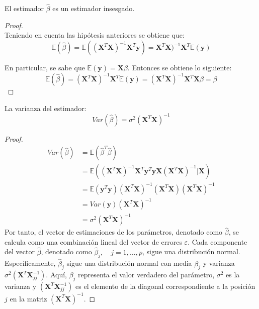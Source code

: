 \begin{propo}
El estimador $\hat{\beta}$ es un estimador insesgado.
\begin{proof}  
\noindent \\ Teniendo en cuenta las hipótesis anteriores se obtiene que:
\begin{equation}
\mathbb{E}(\hat{\beta})=\mathbb{E}((\textbf{X}^T\textbf{X})^{-1}\textbf{X}^T \mathbf{y})=\textbf{X}^T\textbf{X})^{-1}\textbf{X}^T\mathbb{E}(\mathbf{y})
\end{equation}

\noindent En particular, se sabe que $\mathbb{E}(\mathbf{y})=\mathbf{X}\beta$. Entonces se obtiene lo siguiente:
\begin{equation}
\mathbb{E}(\hat{\beta})=(\textbf{X}^T\textbf{X})^{-1}\textbf{X}^T\mathbb{E}(\mathbf{y})=(\textbf{X}^T\textbf{X})^{-1}\textbf{X}^T \mathbf{X}\beta=\beta
\end{equation}
\end{proof}
\end{propo}
\begin{propo}
La varianza del estimador:
\begin{equation}
Var(\hat{\beta})= \sigma^2 (\mathbf{X}^T \mathbf{X})^{-1}
\end{equation}
\begin{proof}
\begin{equation}
\begin{split}
Var(\hat{\beta})&= \mathbb{E}(\hat{\beta}^T\hat{\beta})\\
&=\mathbb{E}((\mathbf{X}^T \mathbf{X})^{-1}\mathbf{X}^T \mathbf{y}^T\mathbf{y}\mathbf{X}(\mathbf{X}^T \mathbf{X})^{-1}|\mathbf{X})\\
&=\mathbb{E}(\mathbf{y}^T\mathbf{y}) (\mathbf{X}^T \mathbf{X})^{-1}(\mathbf{X}^T \mathbf{X})(\mathbf{X}^T \mathbf{X})^{-1} \\
&=Var(\mathbf{y})(\mathbf{X}^T \mathbf{X})^{-1}\\&=\sigma^2 (\mathbf{X}^T \mathbf{X})^{-1}
\end{split}
\end{equation}
\noindent Por tanto, el vector de estimaciones de los parámetros, denotado como $\hat{\beta}$, se calcula como una combinación lineal del vector de errores $\varepsilon$. Cada componente del vector $\hat{\beta}$, denotado como $\hat{\beta}_j,\quad j=1, \ldots, p$, sigue una distribución normal. Específicamente, $\hat{\beta}_j$ sigue una distribución normal con media $\beta_j$ y varianza $\sigma^2(\mathbf{X}^T\mathbf{X}_{jj}^{-1})$. Aquí, $\beta_j$ representa el valor verdadero del parámetro, $\sigma^2$ es la varianza y $(\mathbf{X}^T\mathbf{X}_{jj}^{-1})$ es el elemento de la diagonal correspondiente a la posición $j$ en la matriz $(\mathbf{X}^T\mathbf{X})^{-1}$.
\end{proof}
\end{propo}



